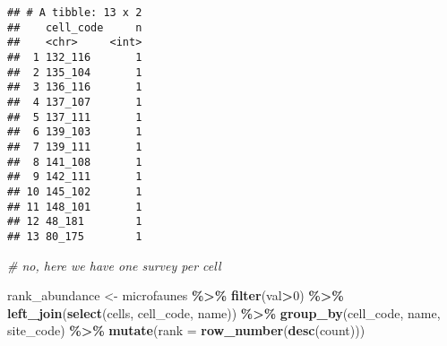 \documentclass[
]{book}
\newenvironment{Shaded}{\begin{snugshade}}{\end{snugshade}}
\newcommand{\CommentTok}[1]{\textcolor[rgb]{0.56,0.35,0.01}{\textit{#1}}}
\newcommand{\DataTypeTok}[1]{\textcolor[rgb]{0.13,0.29,0.53}{#1}}
\newcommand{\DecValTok}[1]{\textcolor[rgb]{0.00,0.00,0.81}{#1}}
\newcommand{\KeywordTok}[1]{\textcolor[rgb]{0.13,0.29,0.53}{\textbf{#1}}}
\newcommand{\NormalTok}[1]{#1}
\newcommand{\OperatorTok}[1]{\textcolor[rgb]{0.81,0.36,0.00}{\textbf{#1}}}
\newcommand{\StringTok}[1]{\textcolor[rgb]{0.31,0.60,0.02}{#1}}
\begin{document}
\begin{Shaded}
\end{Shaded}

\begin{verbatim}
## # A tibble: 13 x 2
##    cell_code     n
##    <chr>     <int>
##  1 132_116       1
##  2 135_104       1
##  3 136_116       1
##  4 137_107       1
##  5 137_111       1
##  6 139_103       1
##  7 139_111       1
##  8 141_108       1
##  9 142_111       1
## 10 145_102       1
## 11 148_101       1
## 12 48_181        1
## 13 80_175        1
\end{verbatim}

\begin{Shaded}
\begin{Highlighting}[]
\CommentTok{\# no, here we have one survey per cell}
\end{Highlighting}
\end{Shaded}

\begin{Shaded}
\begin{Highlighting}[]
\NormalTok{rank\_abundance \textless{}{-}}\StringTok{ }\NormalTok{microfaunes }\OperatorTok{\%\textgreater{}\%}\StringTok{ }
\StringTok{  }\KeywordTok{filter}\NormalTok{(val}\OperatorTok{\textgreater{}}\DecValTok{0}\NormalTok{) }\OperatorTok{\%\textgreater{}\%}\StringTok{ }
\StringTok{  }\KeywordTok{left\_join}\NormalTok{(}\KeywordTok{select}\NormalTok{(cells, cell\_code, name)) }\OperatorTok{\%\textgreater{}\%}\StringTok{ }
\StringTok{  }\KeywordTok{group\_by}\NormalTok{(cell\_code, name, site\_code) }\OperatorTok{\%\textgreater{}\%}\StringTok{ }
\StringTok{  }\KeywordTok{mutate}\NormalTok{(}\DataTypeTok{rank =} \KeywordTok{row\_number}\NormalTok{(}\KeywordTok{desc}\NormalTok{(count)))}
\end{Highlighting}
\end{Shaded}
\end{document}
